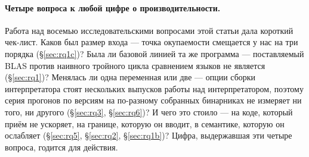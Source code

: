 \paragraph{Четыре вопроса к любой цифре о производительности.} Работа над восемью
исследовательскими вопросами этой статьи дала короткий чек-лист. Каков был размер входа --- точка
окупаемости смещается у нас на три
порядка (\S\ref{sec:rq1c})? Была ли базовой линией та же программа --- поставляемый BLAS против
наивного тройного цикла сравнением языков не является (\S\ref{sec:rq1})? Менялась ли одна
переменная или две --- опции сборки интерпретатора стоят нескольких выпусков работы над
интерпретатором, поэтому серия прогонов по версиям на по-разному собранных бинарниках не измеряет ни того,
ни другого (\S\ref{sec:rq3}, \S\ref{sec:rq6})? И чего это стоило --- на коде, который приём не
ускоряет, на границе, которую он вводит, в семантике, которую он ослабляет (\S\ref{sec:rq5},
\S\ref{sec:rq2}, \S\ref{sec:rq1b})? Цифра, выдержавшая эти четыре вопроса, годится для действия.
